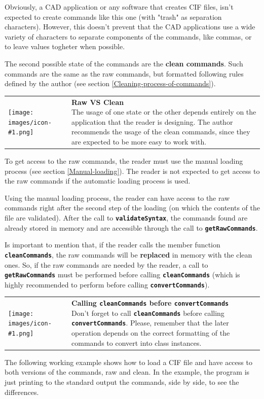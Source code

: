 \documentclass[11pt,twoside,openany,x11names,svgnames]{memoir}
\makeatletter
\newcommand{\IconNote}[3]
{
	\begin{table}[ht]
	\begin{tabular}{ lm{\dimexpr\textwidth-8\tabcolsep-\wd0}@{}}
		\toprule
		\texttt{[image: images/icon-\#1.png]}
		&
		\parbox[t]{155mm}{
		\textbf{#2} \\
		#3
		}
	\end{tabular}
\end{table}
}
\makeatother
\begin{document}
Obviously, a CAD application or any software that creates CIF files, isn't expected to create commands like this one (with "trash" as separation characters). However, this doesn't prevent that the CAD applications use a wide variety of characters to separate components of the commands, like commas, or to leave values togheter when possible.

The second possible state of the commands are the \textbf{clean commands}. Such commands are the same as the raw commands, but formatted following rules defined by the author (see section \ref{Cleaning-process-of-commands}).

\IconNote
	{info}
	{Raw VS Clean}
	{The usage of one state or the other depends entirely on the application that the reader is designing. The author recommends the usage of the clean commands, since they are expected to be more easy to work with.}
	
To get access to the raw commands, the reader must use the manual loading process (see section \ref{Manual-loading}). The reader is not expected to get access to the raw commands if the automatic loading process is used.

Using the manual loading process, the reader can have access to the raw commands right after the second step of the loading (on which the contents of the file are validated). After the call to \textbf{\texttt{validateSyntax}}, the commands found are already stored in memory and are accessible through the call to \textbf{\texttt{getRawCommands}}.

Is important to mention that, if the reader calls the member function \textbf{\texttt{cleanCommands}}, the raw commands will be \textbf{replaced} in memory with the clean ones. So, if the raw commands are needed by the reader, a call to \textbf{\texttt{getRawCommands}} must be performed before calling \textbf{\texttt{cleanCommands}} (which is highly recommended to perform before calling \textbf{\texttt{convertCommands}}).

\IconNote
	{warning}
	{Calling \textbf{\texttt{cleanCommands}} before \textbf{\texttt{convertCommands}}}
	{Don't forget to call \textbf{\texttt{cleanCommands}} before calling \textbf{\texttt{convertCommands}}. Please, remember that the later operation depends on the correct formatting of the commands to convert into class instances.}

The following working example shows how to load a CIF file and have access to both versions of the commands, raw and clean. In the example, the program is just printing to the standard output the commands, side by side, to see the differences.
\end{document}
